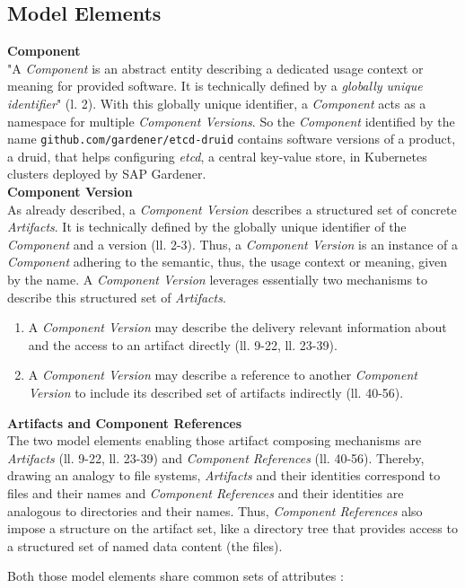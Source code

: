 \subsection{Model Elements}

\noindent\textbf{Component}\\
"A \emph{Component} is an abstract entity describing a dedicated usage context or meaning for provided software. It is technically defined by a \emph{globally unique identifier}"\cite{OCMSpec} (l. 2). With this globally unique identifier, a \emph{Component} acts as a namespace for multiple \emph{Component Versions}. So the \emph{Component} identified by the name \lstinline|github.com/gardener/etcd-druid| contains software versions of a product, a druid, that helps configuring \emph{etcd}, a central key-value store, in Kubernetes clusters deployed by SAP Gardener.\\

\noindent\textbf{Component Version}\\
As already described, a \emph{Component Version} describes a structured set of concrete \emph{Artifacts}. It is technically defined by the globally unique identifier of the \emph{Component} and a version (ll. 2-3). Thus, a \emph{Component Version} is an instance of a \emph{Component} adhering to the semantic, thus, the usage context or meaning, given by the name. A \emph{Component Version} leverages essentially two mechanisms to describe this structured set of \emph{Artifacts}. 
\begin{enumerate}
\item A \emph{Component Version} may describe the delivery relevant information about and the access to an artifact directly (ll. 9-22, ll. 23-39).
\item A \emph{Component Version} may describe a reference to another \emph{Component Version} to include its described set of artifacts indirectly (ll. 40-56).
\end{enumerate}

\noindent\textbf{Artifacts and Component References}\\
The two model elements enabling those artifact composing mechanisms are \emph{Artifacts} (ll. 9-22, ll. 23-39) and \emph{Component References} (ll. 40-56). Thereby, drawing an analogy to file systems, \emph{Artifacts} and their identities correspond to files and their names and \emph{Component References} and their identities are analogous to directories and their names. Thus, \emph{Component References} also impose a structure on the artifact set, like a directory tree that provides access to a structured set of named data content (the files).\par
\noindent Both those model elements share common sets of attributes \cite{OCMSpec}:\\

